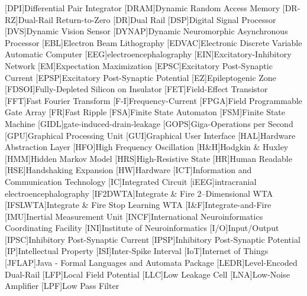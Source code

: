 [DPI]{Differential Pair Integrator}
[DRAM]{Dynamic Random Access Memory}
[DR-RZ]{Dual-Rail Return-to-Zero}
[DR]{Dual Rail}
[DSP]{Digital Signal Processor}
[DVS]{Dynamic Vision Sensor}
[DYNAP]{Dynamic Neuromorphic Asynchronous Processor}
[EBL]{Electron Beam Lithography}
[EDVAC]{Electronic Discrete Variable Automatic Computer}
[EEG]{electroencephalography}
[EIN]{Excitatory-Inhibitory Network}
[EM]{Expectation Maximization}
[EPSC]{Excitatory Post-Synaptic Current}
[EPSP]{Excitatory Post-Synaptic Potential}
[EZ]{Epileptogenic Zone}
[FDSOI]{Fully-Depleted Silicon on Insulator}
[FET]{Field-Effect Transistor}
[FFT]{Fast Fourier Transform}
[F-I]{Frequency-Current}
[FPGA]{Field Programmable Gate Array}
[FR]{Fast Ripple}
[FSA]{Finite State Automaton}
[FSM]{Finite State Machine}
[GIDL]{gate-induced-drain-leakage}
[GOPS]{Giga-Operations per Second}
[GPU]{Graphical Processing Unit}
[GUI]{Graphical User Interface}
[HAL]{Hardware Abstraction Layer}
[HFO]{High Frequency Oscillation}
[H\&H]{Hodgkin \& Huxley}
[HMM]{Hidden Markov Model}
[HRS]{High-Resistive State}
[HR]{Human Readable}
[HSE]{Handshaking Expansion}
[HW]{Hardware}
[ICT]{Information and Communication Technology}
[IC]{Integrated Circuit}
[iEEG]{intracranial electroencephalography}
[IF2DWTA]{Integrate \& Fire 2--Dimensional WTA}
[IFSLWTA]{Integrate \& Fire Stop Learning WTA}
[I\&F]{Integrate-and-Fire}
[IMU]{Inertial Measurement Unit}
[INCF]{International Neuroinformatics Coordinating Facility}
[INI]{Institute of Neuroinformatics}
[I/O]{Input/Output}
[IPSC]{Inhibitory Post-Synaptic Current}
[IPSP]{Inhibitory Post-Synaptic Potential}
[IP]{Intellectual Property}
[ISI]{Inter-Spike Interval}
[IoT]{Internet of Things}
[JFLAP]{Java - Formal Languages and Automata Package}
[LEDR]{Level-Encoded Dual-Rail}
[LFP]{Local Field Potential}
[LLC]{Low Leakage Cell}
[LNA]{Low-Noise Amplifier}
[LPF]{Low Pass Filter}
